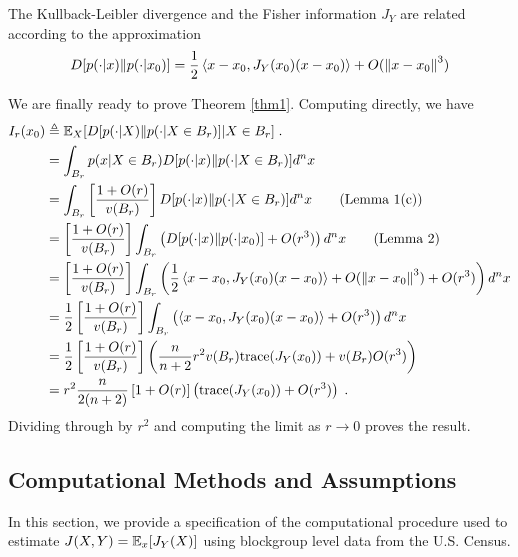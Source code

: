 	\begin{fct*}
		The Kullback-Leibler divergence and the Fisher information $J_Y$ are related according to the approximation 
		\begin{equation}
			D[p(\cdot|x)\| p(\cdot|x_0)] = \frac{1}{2}\left<x - x_0, J_Y(x_0)(x - x_0) \right> + O(\left\lVert x - x_0\right\rVert^3)
		\end{equation}
	\end{fct*}

	We are finally ready to prove Theorem \ref{thm1}. Computing directly, we have 
	\begin{align}
		I_r(x_0) &\triangleq \mathbb{E}_X[D[p(\cdot|X)\| p(\cdot|X \in B_r)]|X \in B_r]\;. \\
		&= \int_{B_r} p(x|X \in B_r) D[p(\cdot|x)\| p(\cdot|X \in B_r)] d^n x \\
		&= \int_{B_r} \left[\frac{1 + O(r)}{v(B_r)}\right] D[p(\cdot|x)\| p(\cdot|X \in B_r)] d^n x \tag{Lemma 1(c)}\\ 
		&= \left[\frac{1 + O(r)}{v(B_r)}\right]\int_{B_r}  \left(D[p(\cdot|x)\| p(\cdot|x_0)] + O(r^{3})\right) d^n x \tag{Lemma 2}\\
		&= \left[\frac{1 + O(r)}{v(B_r)}\right]\int_{B_r} \left( \frac{1}{2}\left<x - x_0, J_Y(x_0)(x - x_0) \right> + O(\left\lVert x - x_0\right\rVert^3) + O(r^{3})\right) d^n x \\
		&= \frac{1}{2}\left[\frac{1 + O(r)}{v(B_r)}\right]\int_{B_r} \left(\left<x - x_0, J_Y(x_0)(x - x_0) \right> + O(r^{3})\right) d^n x \\
		&= \frac{1}{2}\left[\frac{1 + O(r)}{v(B_r)}\right]\left(\frac{n}{n+2} r^{2} v(B_r) \text{trace} (J_Y(x_0)) + v(B_r)O(r^{3})\right) \\
		&= r^2\frac{n}{2(n+2)}\left[1 + O(r)\right]\left(\text{trace} (J_Y(x_0)) + O(r^{3})\right)\;.
	\end{align}
	Dividing through by $r^2$ and computing the limit as $r \rightarrow 0$ proves the result. 


\subsection*{Computational Methods and Assumptions}
	In this section, we provide a specification of the computational procedure used to estimate $J(X,Y) = \mathbb{E}_x[J_Y(X)]$ using blockgroup level data from the U.S. Census. 

